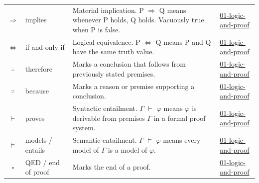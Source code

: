 \documentclass[10pt]{article}
\begin{document}
\begin{longtable}{@{} >{$}c<{$} l p{6.5cm} l @{}}
\Rightarrow & implies & Material implication. P $\Rightarrow$ Q means whenever P holds, Q holds. Vacuously true when P is false. & \href{https://github.com/pleyva2004/math-foundations/tree/main/concepts/01-logic-and-proof}{01-logic-and-proof} \\
\Leftrightarrow & if and only if & Logical equivalence. P $\Leftrightarrow$ Q means P and Q have the same truth value. & \href{https://github.com/pleyva2004/math-foundations/tree/main/concepts/01-logic-and-proof}{01-logic-and-proof} \\
\therefore & therefore & Marks a conclusion that follows from previously stated premises. & \href{https://github.com/pleyva2004/math-foundations/tree/main/concepts/01-logic-and-proof}{01-logic-and-proof} \\
\because & because & Marks a reason or premise supporting a conclusion. & \href{https://github.com/pleyva2004/math-foundations/tree/main/concepts/01-logic-and-proof}{01-logic-and-proof} \\
\vdash & proves & Syntactic entailment. $\Gamma$ $\vdash$ $\varphi$ means $\varphi$ is derivable from premises $\Gamma$ in a formal proof system. & \href{https://github.com/pleyva2004/math-foundations/tree/main/concepts/01-logic-and-proof}{01-logic-and-proof} \\
\vDash & models / entails & Semantic entailment. $\Gamma$ $\vDash$ $\varphi$ means every model of $\Gamma$ is a model of $\varphi$. & \href{https://github.com/pleyva2004/math-foundations/tree/main/concepts/01-logic-and-proof}{01-logic-and-proof} \\
\square & QED / end of proof & Marks the end of a proof. & \href{https://github.com/pleyva2004/math-foundations/tree/main/concepts/01-logic-and-proof}{01-logic-and-proof} \\
\end{longtable}
\end{document}
